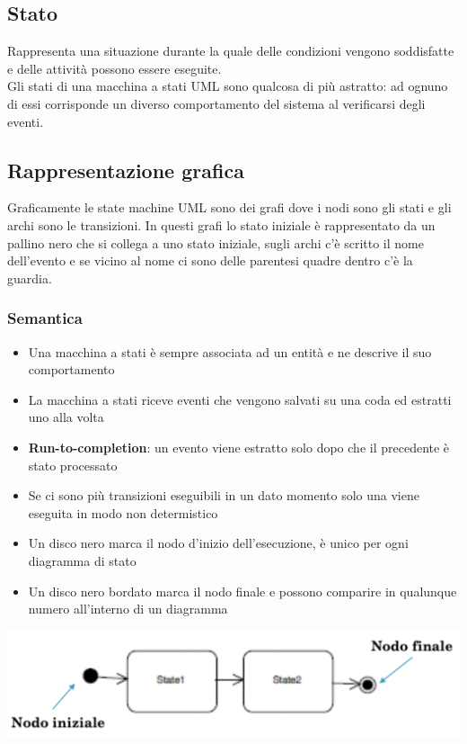 \documentclass[12pt, a4paper]{report}
\begin{document}
\subsection{Stato}
Rappresenta una situazione durante la quale delle condizioni vengono soddisfatte e delle attività possono essere eseguite.\\
Gli stati di una macchina a stati UML sono qualcosa di più astratto: ad ognuno di essi corrisponde un diverso comportamento del sistema al verificarsi degli eventi.
\subsection{Rappresentazione grafica}
Graficamente le state machine UML sono dei grafi dove i nodi sono gli stati e gli archi sono le transizioni. In questi grafi lo stato iniziale è rappresentato da un pallino nero che si collega a uno stato iniziale, sugli archi c'è scritto il nome dell'evento e se vicino al nome ci sono delle parentesi quadre dentro c'è la guardia.
\subsubsection{Semantica}
\begin{itemize}
    \item Una macchina a stati è sempre associata ad un entità e ne descrive il suo comportamento
    \item La macchina a stati riceve eventi che vengono salvati su una coda ed estratti uno alla volta
    \item \textbf{Run-to-completion}: un evento viene estratto solo dopo che il precedente è stato processato
    \item Se ci sono più transizioni eseguibili in un dato momento solo una viene eseguita in modo non determistico
    \item Un disco nero marca il nodo d'inizio dell'esecuzione, è unico per ogni diagramma di stato
    \item Un disco nero bordato marca il nodo finale e possono comparire in qualunque numero all'interno di un diagramma
\end{itemize}
\begin{center}
    \includegraphics[width=.7\textwidth]{Immagini/UMLStateMachine.png}
\end{center}
\end{document}
